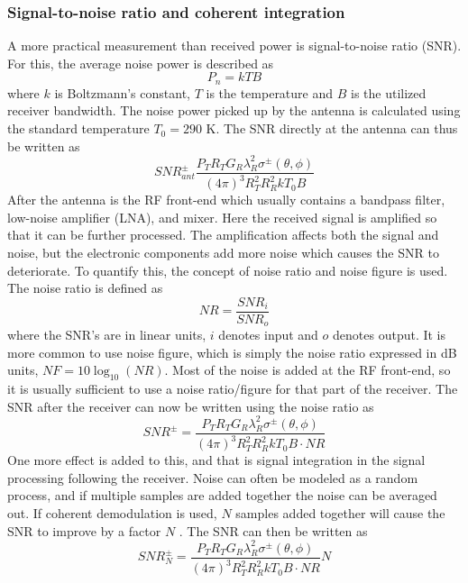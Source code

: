 \documentclass[10pt,a4paper,draft]{scrartcl}
\begin{document}
	\subsubsection{Signal-to-noise ratio and coherent integration}
	A more practical measurement than received power is signal-to-noise ratio (SNR). For this, the average noise power is described as \cite{Young2004}
	\begin{equation*}
		P_n = kTB
	\end{equation*}
	where $k$ is Boltzmann's constant, $T$ is the temperature and $B$ is the utilized receiver bandwidth. The noise power picked up by the antenna is calculated using the standard temperature $T_0 = 290$ K. The SNR directly at the antenna can thus be written as
	\begin{equation*}
		\mathit{SNR}^\pm_{ant} \frac{P_T R_T G_R \lambda_R^2 \sigma^\pm (\theta,\phi)}{(4\pi)^3 R_T^2 R_R^2 kT_0 B}
	\end{equation*}
	After the antenna is the RF front-end which usually contains a bandpass filter, low-noise amplifier (LNA), and mixer. Here the received signal is amplified so that it can be further processed. The amplification affects both the signal and noise, but the electronic components add more noise which causes the SNR to deteriorate. To quantify this, the concept of noise ratio and noise figure is used. The noise ratio is defined as \cite{Young2004}
	\begin{equation*}
		\mathit{NR} = \frac{\mathit{SNR}_i}{\mathit{SNR}_o}
	\end{equation*}
	where the SNR's are in linear units, $i$ denotes input and $o$ denotes output. It is more common to use noise figure, which is simply the noise ratio expressed in dB units, $\mathit{NF} = 10\log_{10}(\mathit{NR})$. Most of the noise is added at the RF front-end, so it is usually sufficient to use a noise ratio/figure for that part of the receiver. The SNR after the receiver can now be written using the noise ratio as
	\begin{equation*}
		\mathit{SNR}^\pm = \frac{P_T R_T G_R \lambda_R^2 \sigma^\pm (\theta,\phi)}{(4\pi)^3 R_T^2 R_R^2 kT_0 B \cdot \mathit{NR}}
	\end{equation*}
	One more effect is added to this, and that is signal integration in the signal processing following the receiver. Noise can often be modeled as a random process, and if multiple samples are added together the noise can be averaged out. If coherent demodulation is used, $N$ samples added together will cause the SNR to improve by a factor $N$ \cite{Richards2012}. The SNR can then be written as
	\begin{equation*}
		\textit{SNR}^\pm_N = \frac{P_T R_T G_R \lambda_R^2 \sigma^\pm (\theta,\phi)}{(4\pi)^3 R_T^2 R_R^2 kT_0 B \cdot \mathit{NR}} N
	\end{equation*}
	
\end{document}
